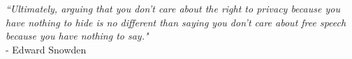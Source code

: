 \thispagestyle{plain}

{
\raggedleft
\textit{“Ultimately, arguing that you don't care about the right to privacy because you have nothing to hide is no different than saying you don't care about free speech because you have nothing to say."}
\\ - Edward Snowden

}
